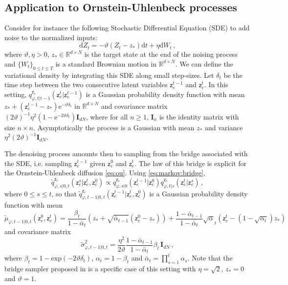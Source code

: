 \documentclass{article}
\theoremstyle{plain}
\theoremstyle{definition}
\theoremstyle{remark}
\newcommand{\latentcont}{\mathsf{z}_e}
\newcommand{\bckw}{\tilde{q}}
\begin{document}
\subsection{Application to Ornstein-Uhlenbeck processes}
\label{sec:OU}
Consider for instance the following Stochastic Differential Equation (SDE) to add noise to the  normalized inputs:
\begin{equation}
\label{eq:ou}
\mathrm{d}Z_t = -\vartheta (Z_t - z_*)\mathrm{d}t + \eta\mathrm{d}W_t\,,
\end{equation}
where $\vartheta, \eta>0$,  $z_*\in\mathbb{R}^{d\times N}$ is the target state at the end of the noising process and $\{W_t\}_{0\leqslant t\leqslant T}$ is a standard Brownian motion in $\mathbb{R}^{d\times N}$. We can define the variational density by integrating this SDE along small step-sizes. Let $\delta_t$ be the time step between the two consecutive latent variables $\latentcont^{t-1}$ and $\latentcont^{t}$. In this setting, $q^{\latentcont}_{\varphi,t|t-1}(\latentcont^t|\latentcont^{t-1})$ is a Gaussian probability density function with mean $z_* + (\latentcont^{t-1}-z_*)\mathrm{e}^{-\vartheta \delta_t}$ in $\mathbb{R}^{d\times N}$ and covariance matrix $(2\vartheta)^{-1}\eta^2(1-\mathrm{e}^{-2\vartheta\delta_t})\mathbf{I}_{dN}$, where for all $n\geqslant 1$, $\mathbf{I}_{n}$ is the identity matrix with size $n\times n$. Asymptotically the process is a Gaussian with mean $z_*$ and variance $\eta^2(2\vartheta)^{-1} \mathbf{I}_{dN}$.

The denoising process amounts then to sampling from the bridge associated with the SDE, i.e. sampling $\latentcont^{t-1}$ given $\latentcont^0$ and $\latentcont^t$. The law of this bridge is explicit for the Ornstein-Uhlenbeck diffusion \eqref{eq:ou}.
Using \eqref{eq:markov:bridge},
$$
\bckw^{\latentcont}_{\varphi,s|0,t}(\latentcont^{s}|\latentcont^{t},\latentcont^{0}) \propto q^{\latentcont}_{\varphi,s|0}(\latentcont^{t-1}|\latentcont^{0}) q^{\latentcont}_{\varphi,t|s}(\latentcont^{t}|\latentcont^{s})\,,
$$
where $0\leqslant s\leqslant t$, so that $\bckw^{\latentcont}_{\varphi,t-1|0,t}(\latentcont^{t-1}|\latentcont^{t},\latentcont^{0})$ is a Gaussian probability density function with mean
$$
 \tilde \mu_{\varphi,t-1|0,t}(\latentcont^0,\latentcont^t) = \frac{\beta_t}{1-\bar{\alpha}_t}\left(z_* + \sqrt{\bar{\alpha}_{t-1}}(\latentcont^0-z_*)\right) + \frac{1-\bar{\alpha}_{t-1}}{1-\bar{\alpha}_t}\sqrt{\alpha}_t\left(\latentcont^t - (1 - \sqrt{\alpha_t} )z_*\right)
$$
 and covariance matrix
 $$
 \tilde \sigma^2_{\varphi,t-1|0,t} = \frac{\eta^2}{2\vartheta}\frac{1- \bar \alpha_{t-1}}{1- \bar \alpha_{t}}\beta_t\, \mathbf{I}_{dN}\,,
 $$
 where $\beta_t = 1 - \mathrm{exp}(-2\vartheta \delta_t)$, $\alpha_t = 1-\beta_t$ and $\bar{\alpha}_t = \prod_{s=1}^{t}\alpha_s$.
 Note that the bridge sampler proposed in \cite{ho2020denoising} is a specific case of this setting with $\eta = \sqrt{2}$, $z_*=0$ and $\vartheta = 1$. 
\end{document}
